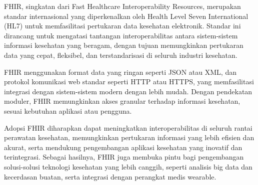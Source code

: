 FHIR, singkatan dari Fast Healthcare Interoperability Resources, merupakan standar internasional yang diperkenalkan oleh Health Level Seven International (HL7) untuk memfasilitasi pertukaran data kesehatan elektronik. Standar ini dirancang untuk mengatasi tantangan interoperabilitas antara sistem-sistem informasi kesehatan yang beragam, dengan tujuan memungkinkan pertukaran data yang cepat, fleksibel, dan terstandarisasi di seluruh industri kesehatan. 

FHIR menggunakan format data yang ringan seperti JSON atau XML, dan protokol komunikasi web standar seperti HTTP atau HTTPS, yang memfasilitasi integrasi dengan sistem-sistem modern dengan lebih mudah. Dengan pendekatan moduler, FHIR memungkinkan akses granular terhadap informasi kesehatan, sesuai kebutuhan aplikasi atau pengguna. 

Adopsi FHIR diharapkan dapat meningkatkan interoperabilitas di seluruh rantai perawatan kesehatan, memungkinkan pertukaran informasi yang lebih efisien dan akurat, serta mendukung pengembangan aplikasi kesehatan yang inovatif dan terintegrasi. Sebagai hasilnya, FHIR juga membuka pintu bagi pengembangan solusi-solusi teknologi kesehatan yang lebih canggih, seperti analisis big data dan kecerdasan buatan, serta integrasi dengan perangkat medis wearable. 